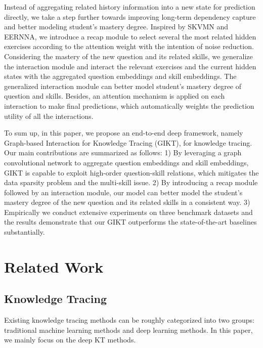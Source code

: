 \documentclass[runningheads]{llncs}
\begin{document}
Instead of aggregating related history information into a new state for prediction directly, we take a step further towards improving long-term dependency capture and better modeling student's mastery degree.
Inspired by SKVMN and EERNNA, we introduce a recap module to select several the most related hidden exercises according to the attention weight with the intention of noise reduction. Considering the mastery of the new question and its related skills, we generalize the interaction module and interact the relevant exercises and the current hidden states with the aggregated question embeddings and skill embeddings. The generalized interaction module can better model student's mastery degree of question and skills. Besides, an attention mechanism is applied on each interaction to make final predictions, which automatically weights the prediction utility of all the interactions.  








To sum up, in this paper, we propose an end-to-end deep framework, namely Graph-based Interaction for Knowledge Tracing (GIKT), for knowledge tracing. Our main contributions are summarized as follows: 1) By leveraging a graph convolutional network to aggregate question embeddings and skill embeddings, GIKT is capable to exploit high-order question-skill relations, which mitigates the data sparsity problem and the multi-skill issue. 2) By introducing a recap module followed by an interaction module, our model can better model the student's mastery degree of the new question and its related skills in a consistent way.
3) Empirically we conduct extensive experiments on three benchmark datasets and the results demonstrate that our GIKT outperforms the state-of-the-art baselines substantially.








\section{Related Work}

\subsection{Knowledge Tracing}

Existing knowledge tracing methods can be roughly categorized into two groups: traditional machine learning methods and deep learning methods. In this paper, we mainly focus on the deep KT methods.
\end{document}
